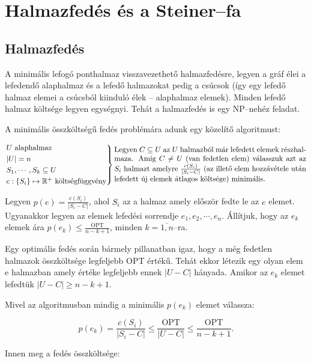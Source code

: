 \skiptooddpage%
\section{Halmazfedés és a Steiner--fa}

\subsection{Halmazfedés}
A minimális lefogó ponthalmaz visszavezethető halmazfedésre, legyen a gráf élei
a lefedendő alaphalmaz és a lefedő halmazokat pedig a csúcsok (így egy lefedő
halmaz elemei a csúcsból kiinduló élek -- alaphalmaz elemek). Minden lefedő
halmaz költsége legyen egységnyi. Tehát a halmazfedés is egy NP--nehéz feladat.

A minimális összköltségű fedés problémára adunk egy közelítő algoritmust:

\[
	\begin{rcases}
		U \mbox{ alaphalmaz}         \\
		|U| = n                      \\
		S_1, \cdots, S_k \subseteq U \\
		c : \{ S_i\} \mapsto \mathbb{R}^+ \mbox{ költségfüggvény}\end{rcases}
	\parbox[L]{9cm} { Legyen $C\subseteq U$ az $U$ halmazból már lefedett elemek %
	részhalmaza. Amig $C \neq U$ (van fedetlen elem) válasszuk azt az $S_i$ halmazt %
	amelyre $\frac{c(S_i)}{|S_i-C|}$ (az illető elem hozzávétele után lefedett új
	elemek átlagos költsége) minimális.
	}
\]

Legyen $p(e)=\frac{c(S_i)}{|S_i-C|}$, ahol $S_i$ az a halmaz amely először fedte
le az $e$ elemet. Ugyanakkor legyen az elemek lefedési sorrendje $e_1, e_2,
	\cdots, e_n$. Állítjuk, hogy az $e_k$ elemek ára
$p(e_k) \leq \frac{\mbox{OPT}}{n-k+1}$, minden $k=\overline{1,n}$--ra.

Egy
optimális fedés során bármely pillanatban igaz, hogy a még fedetlen halmazok
összköltsége legfeljebb OPT értékű. Tehát ekkor létezik egy olyan elem e
halmazban amely értéke legfeljebb ennek $|U-C|$ hányada. Amikor az $e_k$ elemet
lefedtük $|U-C| \geq n-k+1$.

Mivel az algoritmusban mindig a minimális $p(e_k)$ elemet válassza:

\[p(e_k)=\frac{c(S_i)}{|S_i-C|} \leq \frac{\mbox{OPT}}{|U-C|} \leq  \frac{\mbox{OPT}}{n-k+1}.\]

Innen meg a fedés összköltsége:


